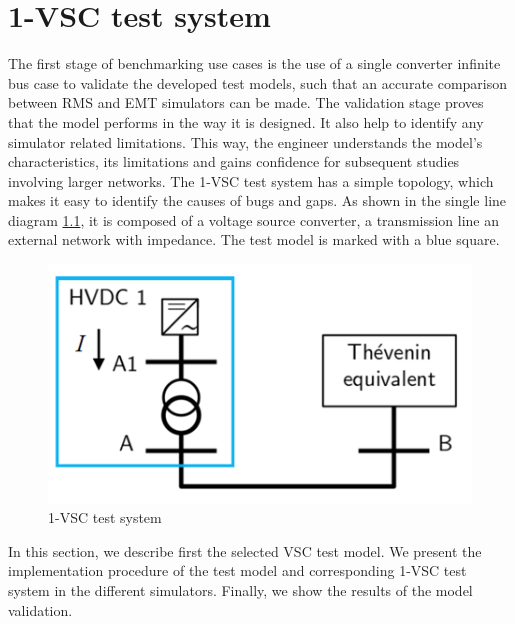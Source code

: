 \documentclass{report}
\begin{document}
\chapter{1-VSC test system}
The first stage of benchmarking use cases is the use of a single converter infinite bus case to validate the developed test models, such that an accurate comparison between RMS and EMT simulators can be made. The validation stage proves that the model performs in the way it is designed. It also help to identify any simulator related limitations. This way, the engineer understands the model’s characteristics, its limitations and gains confidence for subsequent studies involving larger networks. The 1-VSC test system has a simple topology, which makes it easy to identify the causes of bugs and gaps. As shown in the single line diagram \ref{fig:1VSC-SLD}, it is composed of a voltage source converter, a transmission line an external network with impedance. The test model is marked with a blue square. 

\begin{figure}[h]
    \centering
    \includegraphics[width=0.5\linewidth]{Figure_1VSC/1VSC.png}
    \caption{1-VSC test system}
    \label{fig:1VSC-SLD}
\end{figure}

In this section, we describe first the selected VSC test model. We present the implementation procedure of the test model and corresponding 1-VSC test system in the different simulators. Finally, we show the results of the model validation.
\end{document}
